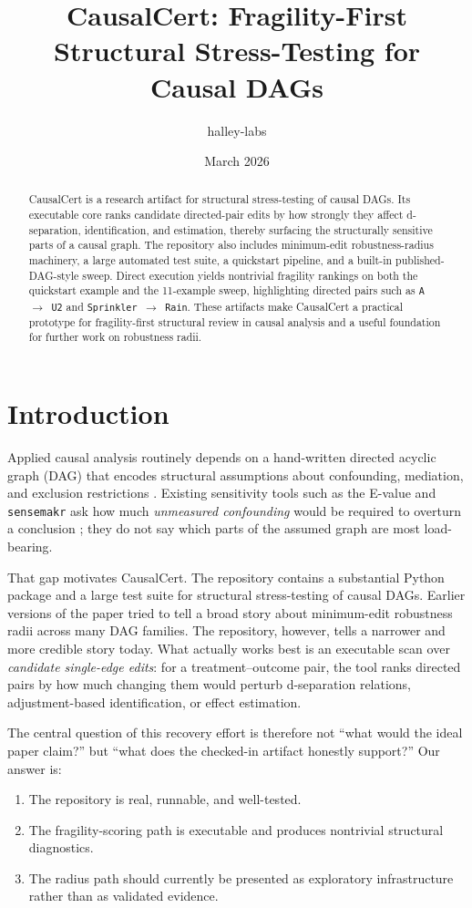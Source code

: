 \documentclass[11pt]{article}
\title{\textbf{CausalCert}: Fragility-First Structural Stress-Testing for Causal DAGs}
\author{halley-labs}
\date{March 2026}
\begin{document}
\maketitle

\begin{abstract}
CausalCert is a research artifact for structural stress-testing of causal DAGs. Its executable core ranks candidate directed-pair edits by how strongly they affect d-separation, identification, and estimation, thereby surfacing the structurally sensitive parts of a causal graph. The repository also includes minimum-edit robustness-radius machinery, a large automated test suite, a quickstart pipeline, and a built-in published-DAG-style sweep. Direct execution yields nontrivial fragility rankings on both the quickstart example and the 11-example sweep, highlighting directed pairs such as \texttt{A $\to$ U2} and \texttt{Sprinkler $\to$ Rain}. These artifacts make CausalCert a practical prototype for fragility-first structural review in causal analysis and a useful foundation for further work on robustness radii.
\end{abstract}

\section{Introduction}

Applied causal analysis routinely depends on a hand-written directed acyclic graph (DAG) that encodes structural assumptions about confounding, mediation, and exclusion restrictions \cite{pearl2009,hernan2020}. Existing sensitivity tools such as the E-value and \texttt{sensemakr} ask how much \emph{unmeasured confounding} would be required to overturn a conclusion \cite{vanderweele2017,cinelli2020}; they do not say which parts of the assumed graph are most load-bearing.

That gap motivates CausalCert. The repository contains a substantial Python package and a large test suite for structural stress-testing of causal DAGs. Earlier versions of the paper tried to tell a broad story about minimum-edit robustness radii across many DAG families. The repository, however, tells a narrower and more credible story today. What actually works best is an executable scan over \emph{candidate single-edge edits}: for a treatment--outcome pair, the tool ranks directed pairs by how much changing them would perturb d-separation relations, adjustment-based identification, or effect estimation.

The central question of this recovery effort is therefore not ``what would the ideal paper claim?'' but ``what does the checked-in artifact honestly support?'' Our answer is:
\begin{enumerate}[leftmargin=*]
    \item The repository is real, runnable, and well-tested.
    \item The fragility-scoring path is executable and produces nontrivial structural diagnostics.
    \item The radius path should currently be presented as exploratory infrastructure rather than as validated evidence.
\end{enumerate}
\end{document}
